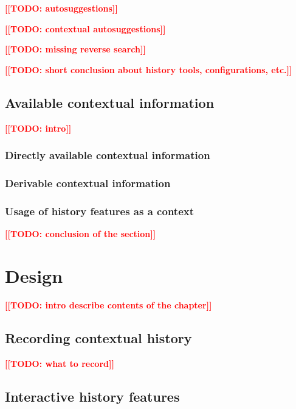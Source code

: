 \documentclass[thesis=M,english]{FITthesis}[2012/10/20]
\newcommand{\todotext}[1]{\textcolor{red}{\textbf{[[#1]]}}}
\newcommand{\blind}[1][1]{\textcolor{mygray}{\Blindtext[#1][1]}}
\begin{document}
\todotext{TODO: autosuggestions}

\todotext{TODO: contextual autosuggestions}

\todotext{TODO: missing reverse search}


\blind[4]

\todotext{TODO: short conclusion about history tools, configurations, etc.}



\section{Available contextual information}

\todotext{TODO: intro}

\subsection{Directly available contextual information}

\blind[2]

\subsection{Derivable contextual information}

\blind[2]

\subsection{Usage of history features as a context}

\blind[2]

\todotext{TODO: conclusion of the section}



\chapter{Design}
\todotext{TODO: intro describe contents of the chapter}

\blind
{}
\section{Recording contextual history}

\todotext{TODO: what to record}

\blind[2]

\section{Interactive history features} %
\end{document}
